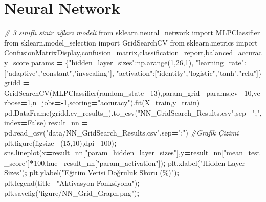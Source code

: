 \documentclass[12pt,twoside]{deuthesis}
\newenvironment{Shaded}{\begin{snugshade}}{\end{snugshade}}
\newcommand{\CommentTok}[1]{\textcolor[rgb]{0.56,0.35,0.01}{\textit{#1}}}
\newcommand{\DecValTok}[1]{\textcolor[rgb]{0.00,0.00,0.81}{#1}}
\newcommand{\ImportTok}[1]{#1}
\newcommand{\NormalTok}[1]{#1}
\newcommand{\OperatorTok}[1]{\textcolor[rgb]{0.81,0.36,0.00}{\textbf{#1}}}
\newcommand{\StringTok}[1]{\textcolor[rgb]{0.31,0.60,0.02}{#1}}
\newcommand{\VariableTok}[1]{\textcolor[rgb]{0.00,0.00,0.00}{#1}}
\begin{document}
\hypertarget{neural-network}{%
\section{Neural Network}\label{neural-network}}
\begin{Shaded}
\begin{Highlighting}[]
\CommentTok{\# 3 sınıflı sinir ağları modeli}
\ImportTok{from}\NormalTok{ sklearn.neural\_network }\ImportTok{import}\NormalTok{ MLPClassifier}
\ImportTok{from}\NormalTok{ sklearn.model\_selection }\ImportTok{import}\NormalTok{ GridSearchCV}
\ImportTok{from}\NormalTok{ sklearn.metrics }\ImportTok{import}\NormalTok{ ConfusionMatrixDisplay,confusion\_matrix,classification\_report,balanced\_accuracy\_score}
\NormalTok{params }\OperatorTok{=}\NormalTok{ \{}\StringTok{"hidden\_layer\_sizes"}\NormalTok{:np.arange(}\DecValTok{1}\NormalTok{,}\DecValTok{26}\NormalTok{,}\DecValTok{1}\NormalTok{),}
          \StringTok{"learning\_rate"}\NormalTok{:[}\StringTok{"adaptive"}\NormalTok{,}\StringTok{"constant"}\NormalTok{,}\StringTok{"invscaling"}\NormalTok{],}
          \StringTok{"activation"}\NormalTok{:[}\StringTok{"identity"}\NormalTok{,}\StringTok{"logistic"}\NormalTok{,}\StringTok{"tanh"}\NormalTok{,}\StringTok{"relu"}\NormalTok{]\}}
\NormalTok{gridd }\OperatorTok{=}\NormalTok{ GridSearchCV(MLPClassifier(random\_state}\OperatorTok{=}\DecValTok{13}\NormalTok{),param\_grid}\OperatorTok{=}\NormalTok{params,cv}\OperatorTok{=}\DecValTok{10}\NormalTok{,verbose}\OperatorTok{=}\DecValTok{1}\NormalTok{,n\_jobs}\OperatorTok{={-}}\DecValTok{1}\NormalTok{,scoring}\OperatorTok{=}\StringTok{"accuracy"}\NormalTok{).fit(X\_train,y\_train)}
\NormalTok{pd.DataFrame(gridd.cv\_results\_).to\_csv(}\StringTok{"NN\_GridSearch\_Results.csv"}\NormalTok{,sep}\OperatorTok{=}\StringTok{";"}\NormalTok{,index}\OperatorTok{=}\VariableTok{False}\NormalTok{)}
\NormalTok{result\_nn }\OperatorTok{=}\NormalTok{ pd.read\_csv(}\StringTok{"data/NN\_GridSearch\_Results.csv"}\NormalTok{,sep}\OperatorTok{=}\StringTok{";"}\NormalTok{)}
\CommentTok{\#Grafik Çizimi}
\NormalTok{plt.figure(figsize}\OperatorTok{=}\NormalTok{(}\DecValTok{15}\NormalTok{,}\DecValTok{10}\NormalTok{),dpi}\OperatorTok{=}\DecValTok{100}\NormalTok{)}\OperatorTok{;}
\NormalTok{sns.lineplot(x}\OperatorTok{=}\NormalTok{result\_nn[}\StringTok{"param\_hidden\_layer\_sizes"}\NormalTok{],y}\OperatorTok{=}\NormalTok{result\_nn[}\StringTok{"mean\_test\_score"}\NormalTok{]}\OperatorTok{*}\DecValTok{100}\NormalTok{,hue}\OperatorTok{=}\NormalTok{result\_nn[}\StringTok{"param\_activation"}\NormalTok{])}\OperatorTok{;}
\NormalTok{plt.xlabel(}\StringTok{"Hidden Layer Sizes"}\NormalTok{)}\OperatorTok{;}
\NormalTok{plt.ylabel(}\StringTok{"Eğitim Verisi Doğruluk Skoru (\%)"}\NormalTok{)}\OperatorTok{;}
\NormalTok{plt.legend(title}\OperatorTok{=}\StringTok{"Aktivasyon Fonksiyonu"}\NormalTok{)}\OperatorTok{;}
\NormalTok{plt.savefig(}\StringTok{"figure/NN\_Grid\_Graph.png"}\NormalTok{)}\OperatorTok{;}
\end{Highlighting}
\end{Shaded}
\end{document}
